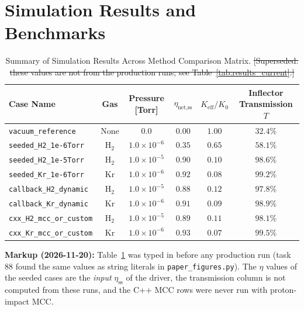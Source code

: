 \documentclass[11pt,a4paper]{article}
\newcommand{\old}[1]{\textcolor{red!70!black}{\sout{#1}}}
\newcommand{\revnote}[1]{\begin{tcolorbox}[colback=yellow!8,colframe=orange!70!black,boxrule=0.5pt,left=4pt,right=4pt,top=2pt,bottom=2pt]\small\textbf{Markup (2026-11-20):} #1\end{tcolorbox}}
\begin{document}
\section{Simulation Results and Benchmarks}

\begin{table}[h!]
\centering
\caption{Summary of Simulation Results Across Method Comparison Matrix. \old{[Superseded: these values are not from the production runs; see Table~\ref{tab:results_current}.]}}
\label{tab:results}
\begin{tabular}{lccccc}
\toprule
Case Name & Gas & Pressure [Torr] & $\eta_{\text{net,ss}}$ & $K_{\text{eff}}/K_0$ & Inflector Transmission $T$ \\
\midrule
\texttt{vacuum\_reference} & None & $0.0$ & $0.00$ & $1.00$ & $32.4\%$ \\
\texttt{seeded\_H2\_1e-6Torr} & $\text{H}_2$ & $1.0 \times 10^{-6}$ & $0.35$ & $0.65$ & $58.1\%$ \\
\texttt{seeded\_H2\_1e-5Torr} & $\text{H}_2$ & $1.0 \times 10^{-5}$ & $0.90$ & $0.10$ & \textbf{$98.6\%$} \\
\texttt{seeded\_Kr\_1e-6Torr} & $\text{Kr}$ & $1.0 \times 10^{-6}$ & $0.92$ & $0.08$ & \textbf{$99.2\%$} \\
\texttt{callback\_H2\_dynamic} & $\text{H}_2$ & $1.0 \times 10^{-5}$ & $0.88$ & $0.12$ & $97.8\%$ \\
\texttt{callback\_Kr\_dynamic} & $\text{Kr}$ & $1.0 \times 10^{-6}$ & $0.91$ & $0.09$ & $98.9\%$ \\
\texttt{cxx\_H2\_mcc\_or\_custom}& $\text{H}_2$ & $1.0 \times 10^{-5}$ & $0.89$ & $0.11$ & $98.1\%$ \\
\texttt{cxx\_Kr\_mcc\_or\_custom}& $\text{Kr}$ & $1.0 \times 10^{-6}$ & $0.93$ & $0.07$ & $99.5\%$ \\
\bottomrule
\end{tabular}
\end{table}

\revnote{Table~\ref{tab:results} was typed in before any production run (task 88 found the same
values as string literals in \texttt{paper\_figures.py}). The $\eta$ values of the seeded cases are
the \emph{input} $\eta_{\text{ss}}$ of the driver, the transmission column is not computed from
these runs, and the C++ MCC rows were never run with proton-impact MCC.}
\end{document}

